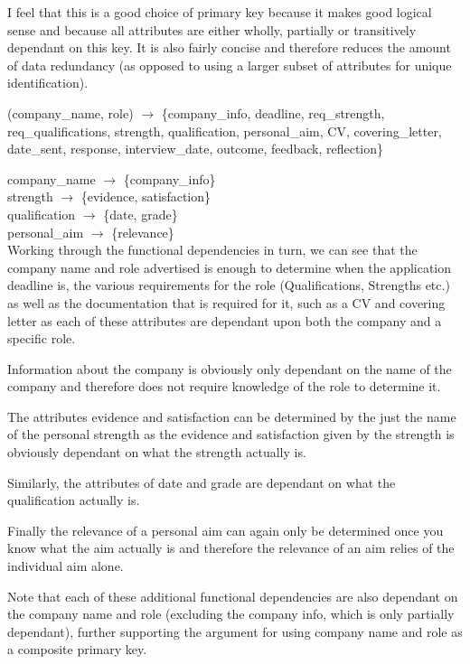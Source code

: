 \documentclass{article}
\begin{document}
I feel that this is a good choice of primary key because it makes good logical sense and because all attributes are either wholly, partially or transitively dependant on this key. It is also fairly concise and therefore reduces the amount of data redundancy (as opposed to using a larger subset of attributes for unique identification).

(company\_name, role) $\rightarrow$ \{company\_info, deadline, req\_strength, req\_qualifications, strength, qualification, personal\_aim, CV, covering\_letter, date\_sent, response, interview\_date, outcome, feedback, reflection\}

company\_name $\rightarrow$ \{company\_info\}\\
strength $\rightarrow$ \{evidence, satisfaction\}\\
qualification $\rightarrow$ \{date, grade\}\\
personal\_aim $\rightarrow$ \{relevance\}\\

Working through the functional dependencies in turn, we can see that the company name and role advertised is enough to determine when the application deadline is, the various requirements for the role (Qualifications, Strengths etc.) as well as the documentation that is required for it, such as a CV and covering letter as each of these attributes are dependant upon both the company and a specific role. 

Information about the company is obviously only dependant on the name of the company and therefore does not require knowledge of the role to determine it.

The attributes evidence and satisfaction can be determined by the just the name of the personal strength as the evidence and satisfaction given by the strength is obviously dependant on what the strength actually is.

Similarly, the attributes of date and grade are dependant on what the qualification actually is.

Finally the relevance of a personal aim can again only be determined once you know what the aim actually is and therefore the relevance of an aim relies of the individual aim alone.

Note that each of these additional functional dependencies are also dependant on the company name and role (excluding the company info, which is only partially dependant), further supporting the argument for using company name and role as a composite primary key.
\end{document}
